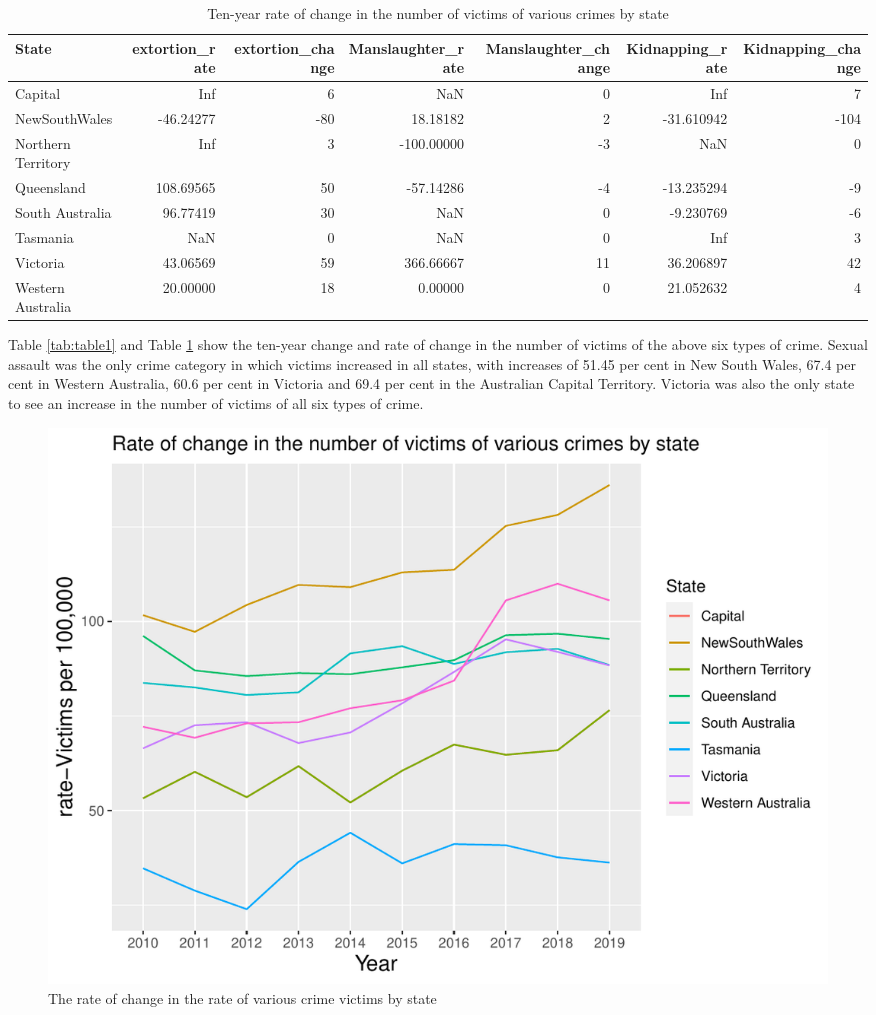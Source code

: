 \documentclass[11pt,a4paper,]{article}
\begin{document}
\begin{table}

\caption{\label{tab:table2}Ten-year rate of change in the number of victims of various crimes by state}
\centering
\begin{tabular}[t]{lrrrrrr}
\toprule
State & extortion\_rate & extortion\_change & Manslaughter\_rate & Manslaughter\_change & Kidnapping\_rate & Kidnapping\_change\\
\midrule
Capital & Inf & 6 & NaN & 0 & Inf & 7\\
NewSouthWales & -46.24277 & -80 & 18.18182 & 2 & -31.610942 & -104\\
Northern Territory & Inf & 3 & -100.00000 & -3 & NaN & 0\\
Queensland & 108.69565 & 50 & -57.14286 & -4 & -13.235294 & -9\\
South Australia & 96.77419 & 30 & NaN & 0 & -9.230769 & -6\\
\addlinespace
Tasmania & NaN & 0 & NaN & 0 & Inf & 3\\
Victoria & 43.06569 & 59 & 366.66667 & 11 & 36.206897 & 42\\
Western Australia & 20.00000 & 18 & 0.00000 & 0 & 21.052632 & 4\\
\bottomrule
\end{tabular}
\end{table}

Table \ref{tab:table1} and Table \ref{tab:table2} show the ten-year change and rate of change in the number of victims of the above six types of crime. Sexual assault was the only crime category in which victims increased in all states, with increases of 51.45 per cent in New South Wales, 67.4 per cent in Western Australia, 60.6 per cent in Victoria and 69.4 per cent in the Australian Capital Territory. Victoria was also the only state to see an increase in the number of victims of all six types of crime.

\begin{figure}
\centering
\includegraphics{report_files/figure-latex/plot3-1.pdf}
\caption{\label{fig:plot3}The rate of change in the rate of various crime victims by state}
\end{figure}
\end{document}
